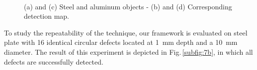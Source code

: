 
\begin{figure}
  \centering
  \hspace*{\fill}
   \hfill
  \hspace*{\fill} \\ \hspace*{\fill}
   \hfill
  \hspace*{\fill}
  \caption{(a) and (c) Steel and aluminum objects - (b) and (d) Corresponding detection map.}
  \label{fig:6}
\end{figure}

To study the repeatability of the technique, our framework is evaluated on steel plate with 16 identical circular defects located at \SI{1}{\milli \metre} depth and a \SI{10}{\milli \metre} diameter. 
The result of this experiment is depicted in Fig.\,\ref{subfig:7b}, in which all defects are successfully detected.


